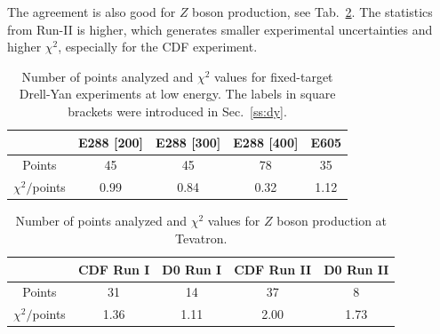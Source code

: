 \documentclass[aps,preprintnumbers,showpacs,nofootinbib,superscriptaddress,floatfix]{revtex4}
\begin{document}
The agreement is also good for $Z$ boson production, see Tab.~\ref{t:fl_ind_chi2_Z}. The statistics from Run-II is higher, which generates smaller experimental uncertainties and higher $\chi^2$, especially for the CDF experiment.
\begin{table}[h!]
\begin{center}
\renewcommand{\tabcolsep}{0.4pc} %
\renewcommand{\arraystretch}{1.2} %
\begin{tabular}{|c|c|c|c|c|}
 \hline
 \hline
 ~                        &  E288 [200]    &  E288 [300]        &  E288 [400]          &  E605                \\
 \hline
 Points                   &      45      &   45             &       78           &     35               \\
 \hline
$ \chi^2  /$points      &  0.99        &    0.84           &       0.32
&   1.12     \\
\hline
\hline
\end{tabular}
\caption{Number of points analyzed and $\chi^2$ values for fixed-target Drell-Yan experiments at low energy. The labels in square brackets were introduced in Sec.~\ref{ss:dy}.}
\label{t:fl_ind_chi2_DY}
\end{center}
\end{table}
\begin{table}[h!]
\begin{center}
\renewcommand{\tabcolsep}{0.4pc} %
\renewcommand{\arraystretch}{1.2} %
\begin{tabular}{|c|c|c|c|c|}
 \hline
\hline
 ~                        & CDF Run I    &  D0 Run I        & CDF Run II        & D0 Run II      \\
 \hline
 Points                   &      31      &   14             &       37          &        8       \\
 \hline
$\chi^2 /$points      &  1.36        &    1.11           &       2.00         &   1.73     \\
\hline
\hline
\end{tabular}
\caption{Number of points analyzed and $\chi^2$ values for $Z$ boson production at Tevatron.}
\label{t:fl_ind_chi2_Z}
\end{center}
\end{table}
\end{document}
